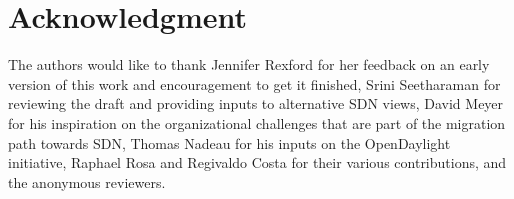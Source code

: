 \documentclass[journal]{IEEEtran}
\begin{document}


%





\section*{Acknowledgment}

The authors would like to thank Jennifer Rexford for her feedback on an early version of this work and encouragement to get it finished, Srini Seetharaman for reviewing the draft and providing inputs to alternative SDN views, David Meyer for his inspiration on the organizational challenges that are part of the migration path towards SDN, Thomas Nadeau for his inputs on the OpenDaylight initiative, Raphael Rosa and Regivaldo Costa for their various contributions, and the anonymous reviewers.
\end{document}
